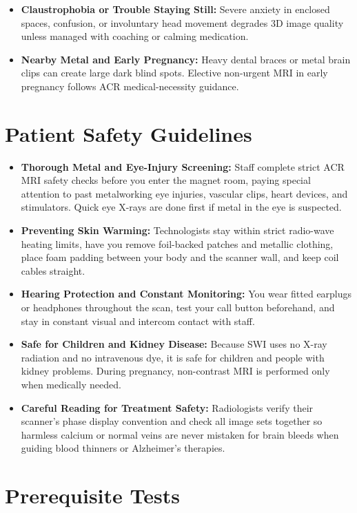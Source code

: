 \begin{itemize}
    \item \textbf{Claustrophobia or Trouble Staying Still:} Severe anxiety in enclosed spaces, confusion, or involuntary head movement degrades 3D image quality unless managed with coaching or calming medication.
    \item \textbf{Nearby Metal and Early Pregnancy:} Heavy dental braces or metal brain clips can create large dark blind spots. Elective non-urgent MRI in early pregnancy follows ACR medical-necessity guidance.
\end{itemize}

\section{Patient Safety Guidelines}

\begin{itemize}
    \item \textbf{Thorough Metal and Eye-Injury Screening:} Staff complete strict ACR MRI safety checks before you enter the magnet room, paying special attention to past metalworking eye injuries, vascular clips, heart devices, and stimulators. Quick eye X-rays are done first if metal in the eye is suspected.
    \item \textbf{Preventing Skin Warming:} Technologists stay within strict radio-wave heating limits, have you remove foil-backed patches and metallic clothing, place foam padding between your body and the scanner wall, and keep coil cables straight.
    \item \textbf{Hearing Protection and Constant Monitoring:} You wear fitted earplugs or headphones throughout the scan, test your call button beforehand, and stay in constant visual and intercom contact with staff.
    \item \textbf{Safe for Children and Kidney Disease:} Because SWI uses no X-ray radiation and no intravenous dye, it is safe for children and people with kidney problems. During pregnancy, non-contrast MRI is performed only when medically needed.
    \item \textbf{Careful Reading for Treatment Safety:} Radiologists verify their scanner's phase display convention and check all image sets together so harmless calcium or normal veins are never mistaken for brain bleeds when guiding blood thinners or Alzheimer's therapies.
\end{itemize}

\section{Prerequisite Tests}

